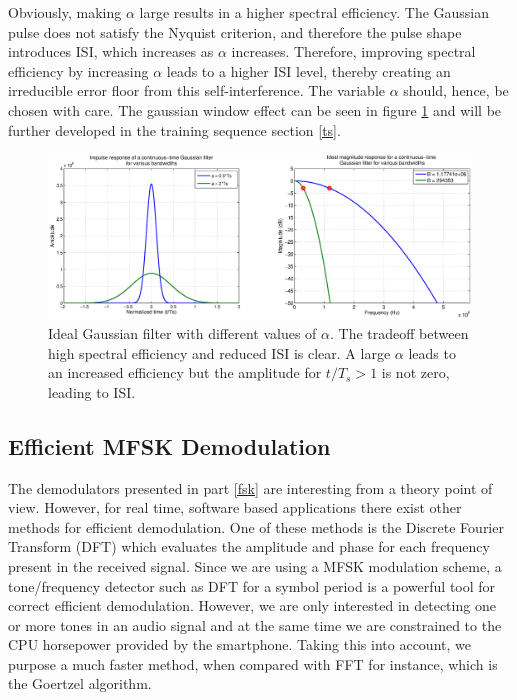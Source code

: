 \documentclass[12pt,a4paper,openright]{article}
\begin{document}
 Obviously, making $\alpha$ large results in a higher spectral efficiency. The Gaussian pulse does not satisfy the Nyquist criterion, and therefore the pulse shape introduces ISI, which increases as $\alpha$ increases. Therefore, improving spectral efficiency by increasing $\alpha$ leads to a higher ISI level, thereby creating an irreducible error floor from this self-interference. The variable $\alpha$ should, hence, be chosen with care. The gaussian window effect can be seen in figure \ref{gaussianalpha} and will be further developed in the training sequence section \ref{ts}.

 \begin{figure}[h]
  \centering
    \includegraphics[width=1\textwidth]{gausswinalpha.eps}
    \caption{Ideal Gaussian filter with different values of $\alpha$. The tradeoff between high spectral efficiency and reduced ISI is clear. A large $\alpha$ leads to an increased efficiency but the amplitude for $t/T_s > 1$ is not zero, leading to ISI.}
    \label{gaussianalpha}
\end{figure} 
 

\subsection{Efficient MFSK Demodulation}

The demodulators presented in part \ref{fsk} are interesting from a theory point of view. However, for real time, software based applications there exist other methods for efficient demodulation. One of these methods is the Discrete Fourier Transform (DFT) which evaluates the amplitude and phase for each frequency present in the received signal. Since we are using a MFSK modulation scheme, a tone/frequency detector such as DFT for a symbol period is a powerful tool for correct efficient demodulation. However, we are only interested in detecting one or more tones in an audio signal and at the same time we are constrained to the CPU horsepower provided by the smartphone. Taking this into account, we purpose a much faster method, when compared with FFT for instance, which is the Goertzel algorithm. 
\end{document}

